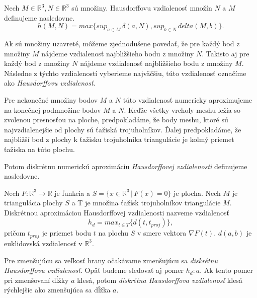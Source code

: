 \begin{enumerate}
{    \begin{definition}
        Nech $M \in \mathbb{R}^3, N \in \mathbb{R}^3$ sú množiny.
        Hausdorffovu vzdialenosť množín $N$ a $M$ definujeme nasledovne.
        \begin{equation}
            h(M, N) = max \big \{sup_{a \in M} \, \delta(a, N), sup_{b \in N} \, delta(M, b) \big \}.
        \end{equation}
    \end{definition}

    Ak sú množiny uzavreté, môžeme zjednodušene povedať, že pre každý bod z množiny $M$ nájdeme 
    vzdialenosť najbližšieho bodu z množiny $N$.
    Takisto aj pre každý bod z množiny $N$ nájdeme vzdialenosť najbližšieho bodu z množiny $M$.
    Následne z týchto vzdialeností vyberieme najväčšiu, túto vzdialenosť označíme ako 
    \textit{Hausdorffovu vzdialenosť}.

    Pre nekonečné množiny bodov $M$ a $N$ túto vzdialenosť numericky aproximujeme na konečnej 
    podmnožine bodov $M$ a $N$. Keďže všetky vrcholy meshu ležia so zvolenou presnosťou na ploche, 
    predpokladáme, že body meshu, ktoré sú najvzdialenejšie od plochy sú ťažiská trojuholníkov.
    Ďalej predpokladáme, že najbližší bod z plochy k ťažisku trojuholníka triangulácie
    je kolmý priemet ťažiska na túto plochu.

    Potom diskrétnu numerickú aproximáciu \textit{Hausdorffovej vzdialenosti} definujeme nasledovne.
    \begin{definition}
        Nech $F:\mathbb{R}^3 \to \mathbb{R}$ je funkcia a $S = \{x \in \mathbb{R}^3 \, | \, F(x)=0 \}$ 
        je plocha. Nech $M$ je triangulácia plochy $S$
        a T je množina ťažísk trojuholníkov triangulácie $M$.
        Diskrétnou aproximáciou Hausdorffovej vzdialenosti nazveme vzdialenosť
        \begin{equation}
            h_d = max_{t \in T} \big \{ d(t, t_{proj})\big \},
        \end{equation}
        pričom $t_{proj}$ je priemet bodu $t$ na plochu $S$ v smere vektora $\nabla F(t)$.
        $d(a, b)$ je euklidovská vzdialenosť v $\mathbb{R}^3$.
    \end{definition}

    Pre zmenšujúcu sa veľkosť hrany očakávame zmenšujúcu sa \textit{diskrétnu Hausdorffovu vzdialenosť}.
    Opäť budeme sledovať aj pomer $h_d : a$. Ak tento pomer pri zmenšovaní dĺžky $a$ klesá, potom 
    \textit{diskrétna Hausdorffova vzdialenosť} klesá rýchlejšie ako zmenšujúca sa dĺžka $a$.

}
\end{enumerate}
